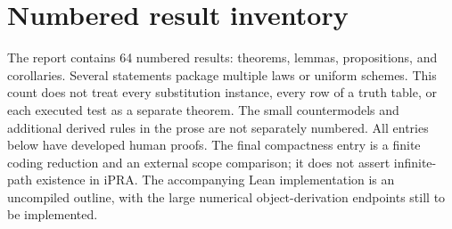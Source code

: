 \section{Numbered result inventory}\label{sec:inventory}
The report contains 64 numbered results: theorems, lemmas, propositions,
and corollaries. Several statements package multiple laws or uniform
schemes. This count does not treat every substitution instance, every row
of a truth table, or each executed test as a separate theorem. The small
countermodels and additional derived rules in the prose are not separately
numbered. All entries below have developed human proofs. The final compactness
entry is a finite coding reduction and an external scope comparison; it
does not assert infinite-path existence in iPRA. The accompanying
Lean implementation is an uncompiled outline, with the large numerical
object-derivation endpoints still to be implemented.

